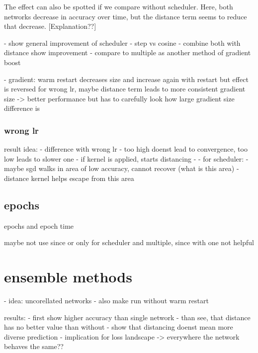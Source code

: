 The effect can also be spotted if we compare without scheduler. Here, both
networks decrease in accuracy over time, but the distance term seems to reduce
that decrease. [Explanation??]




- show general improvement of scheduler
- step vs cosine
- combine both with distance show improvement
- compare to multiple as another method of gradient boost


- gradient:
    warm restart decreases size and increase again with restart
    but effect is reversed for wrong lr, maybe distance term leads to more consistent gradient size -> better performance
    but has to carefully look how large gradient size difference is 
    

\subsubsection{wrong lr}


result idea:
- difference with wrong lr
- too high doenst lead to convergence, too low leads to slower one
- if kernel is applied, starts distancing
- 
-
for scheduler:
- maybe sgd walks in area of low accuracy, cannot recover (what is this area)
- distance kernel helps escape from this area


\subsection{epochs}\label{res:Epochs}
epochs and epoch time

maybe not use since or only for scheduler and multiple, since with one not helpful

\section{ensemble methods}
- idea: uncorellated networks
- also make run without warm restart

results:
- first show higher accuracy than single network
- than see, that distance has no better value than without
- show that distancing doenst mean more diverse prediction
- implication for loss landscape -> everywhere the network behaves the same??



